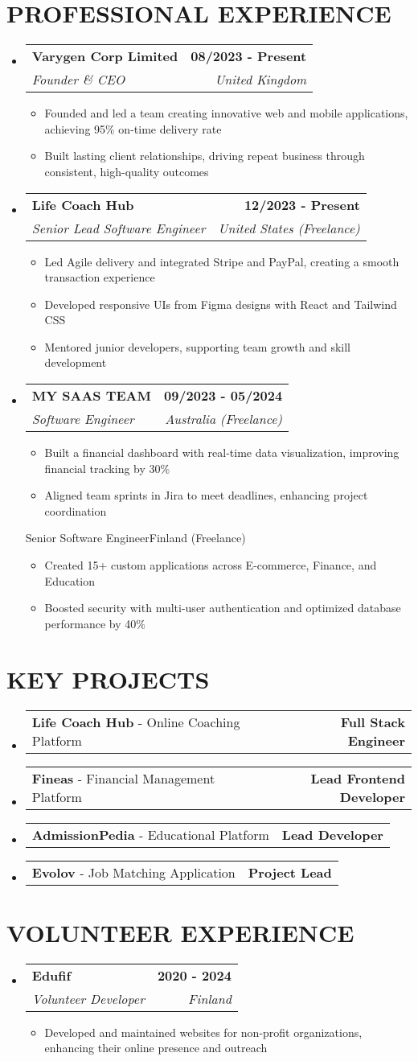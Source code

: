\documentclass[letterpaper,11pt]{article}
\makeatletter
\newcommand{\resumeItem}[1]{
  \item\small{#1}\vspace{-2pt}
}
\newcommand{\resumeSubheading}[4]{
  \vspace{-2pt}\item
    \begin{tabular*}{1.0\textwidth}[t]{l@{\extracolsep{\fill}}r}
      \textbf{\large#1} & \textbf{\small#2} \\
      \textit{\large#3} & \textit{\small#4}
    \end{tabular*}\vspace{-7pt}
}
\newcommand{\resumeProjectHeading}[2]{
    \item
    \begin{tabular*}{1.001\textwidth}{l@{\extracolsep{\fill}}r}
      \small#1 & \textbf{\small#2}
    \end{tabular*}\vspace{-7pt}
}
\newcommand{\resumeSubHeadingListStart}{\begin{itemize}[leftmargin=0.0in, label={}]}
\newcommand{\resumeSubHeadingListEnd}{\end{itemize}}
\newcommand{\resumeItemListStart}{\begin{itemize}}
\newcommand{\resumeItemListEnd}{\end{itemize}\vspace{-5pt}}
\makeatother
\begin{document}
\section{PROFESSIONAL EXPERIENCE}
\resumeSubHeadingListStart

\resumeSubheading
{Varygen Corp Limited}{08/2023 - Present}
{Founder \& CEO}{United Kingdom}
\resumeItemListStart
\resumeItem{Founded and led a team creating innovative web and mobile applications, achieving 95\% on-time delivery rate}
\resumeItem{Built lasting client relationships, driving repeat business through consistent, high-quality outcomes}
\resumeItemListEnd

\resumeSubheading
{Life Coach Hub}{12/2023 - Present}
{Senior Lead Software Engineer}{United States (Freelance)}
\resumeItemListStart
\resumeItem{Led Agile delivery and integrated Stripe and PayPal, creating a smooth transaction experience}
\resumeItem{Developed responsive UIs from Figma designs with React and Tailwind CSS}
\resumeItem{Mentored junior developers, supporting team growth and skill development}
\resumeItemListEnd

\resumeSubheading
{MY SAAS TEAM}{09/2023 - 05/2024}
{Software Engineer}{Australia (Freelance)}
\resumeItemListStart
\resumeItem{Built a financial dashboard with real-time data visualization, improving financial tracking by 30\%}
\resumeItem{Aligned team sprints in Jira to meet deadlines, enhancing project coordination}
\resumeItemListEnd

{Senior Software Engineer}{Finland (Freelance)}
\resumeItemListStart
\resumeItem{Created 15+ custom applications across E-commerce, Finance, and Education}
\resumeItem{Boosted security with multi-user authentication and optimized database performance by 40\%}
\resumeItemListEnd

\resumeSubHeadingListEnd

\section{KEY PROJECTS}
\resumeSubHeadingListStart
\resumeProjectHeading
{\textbf{Life Coach Hub} - Online Coaching Platform}{Full Stack Engineer}
\resumeProjectHeading
{\textbf{Fineas} - Financial Management Platform}{Lead Frontend Developer}
\resumeProjectHeading
{\textbf{AdmissionPedia} - Educational Platform}{Lead Developer}
\resumeProjectHeading
{\textbf{Evolov} - Job Matching Application}{Project Lead}
\resumeSubHeadingListEnd

\section{VOLUNTEER EXPERIENCE}
\resumeSubHeadingListStart
\resumeSubheading
{Edufif}{2020 - 2024}
{Volunteer Developer}{Finland}
\resumeItemListStart
\resumeItem{Developed and maintained websites for non-profit organizations, enhancing their online presence and outreach}
\resumeItemListEnd
\resumeSubHeadingListEnd
\end{document}
